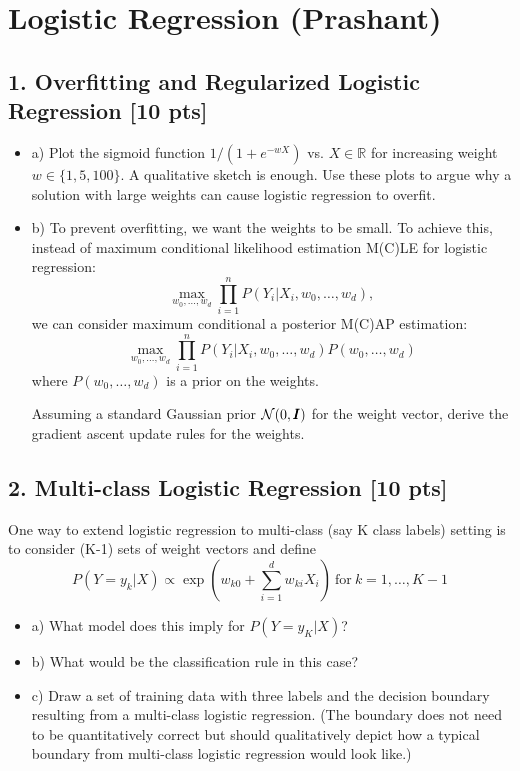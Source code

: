 \documentclass{article}
\newcounter{homeworkProblemCounter} %
\newcommand{\homeworkProblemName}{}
\newenvironment{homeworkProblem}[1][Problem \arabic{homeworkProblemCounter}]{ %
\stepcounter{homeworkProblemCounter} %
\renewcommand{\homeworkProblemName}{#1} %
\section{\homeworkProblemName} %
}{
}
\newcommand{\problemAnswer}[1]{ %
\noindent\framebox[\columnwidth][c]{\begin{minipage}{0.98\columnwidth}#1\end{minipage}} %
}
\newcommand{\homeworkSectionName}{}
\newenvironment{homeworkSection}[1]{ %
\renewcommand{\homeworkSectionName}{#1} %
\subsection{\homeworkSectionName} %
}{
}
\begin{document}
\begin{homeworkProblem}[Logistic Regression (Prashant)] %
\begin{homeworkSection}{1. Overfitting and Regularized Logistic Regression [10 pts]}
\begin{itemize}
\item[]{a)} Plot the sigmoid function $1/(1+e^{-wX})$ vs. $X\in \mathbb{R}$ for increasing weight $w \in \{1, 5, 100\}$. A qualitative sketch is enough. Use these plots to argue why a solution with
large weights can cause logistic regression to overfit.
\item[]{b)}
To prevent overfitting, we want the weights to be small. To achieve this,
instead of maximum conditional likelihood estimation M(C)LE for logistic regression:
$$\max_{w_0,\dots, w_d}\prod^n_{i=1} P(Y_i|X_i, w_0,\dots, w_d),$$
we can consider maximum conditional a posterior M(C)AP estimation:
$$\max_{w_0,\dots, w_d}
\prod^n_{i=1} P(Y_i|X_i, w_0,\dots, w_d) P(w_0, \dots, w_d)
$$
where $P(w_0, \dots, w_d)$ is a prior on the weights.

Assuming a standard Gaussian prior ${\cal N}(0,\pmb{I})$ for the weight vector,
derive the gradient ascent update rules for the weights.
\end{itemize}

\problemAnswer{ %
\lipsum[2]
}
\end{homeworkSection}

\begin{homeworkSection}{2. Multi-class Logistic Regression [10 pts]}
One way to extend logistic regression to multi-class (say K class labels) setting is to consider
(K-1) sets of weight vectors and define
$$
P(Y=y_k|X) \propto \exp(w_{k0}+ \sum^d_{i=1}w_{ki}X_i) \ \mbox{for} \  k = 1, \dots, K-1
$$
\begin{itemize}
\item[]{a)} What model does this imply for $P(Y=y_K|X)$?
\item[]{b)} What would be the classification rule in this case?
\item[]{c)} Draw a set of training data with three labels and the decision boundary resulting from a multi-class logistic regression. (The boundary does not need to be quantitatively correct but should qualitatively depict how a typical boundary from multi-class logistic regression would look like.)
\end{itemize}
\problemAnswer{ %
\lipsum[2]
}
\end{homeworkSection}

\end{homeworkProblem}
\vspace{0.1in}
\end{document}
